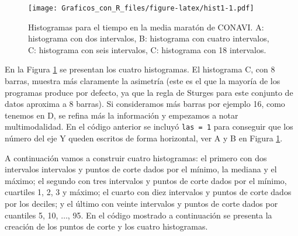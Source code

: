 \documentclass[10pt,]{krantz}
\begin{document}
\begin{figure}
\centering
\texttt{[image: Graficos\_con\_R\_files/figure-latex/hist1-1.pdf]}
\caption{\label{fig:hist1}Histogramas para el tiempo en la media maratón de
CONAVI. A: histograma con dos intervalos, B: histograma con cuatro
intervalos, C: histograma con seis intervalos, C: histograma con 18
intervalos.}
\end{figure}

En la Figura \ref{fig:hist1} se presentan los cuatro histogramas. El
histograma C, con 8 barras, muestra más claramente la asimetría (este es
el que la mayoría de los programas produce por defecto, ya que la regla
de Sturges para este conjunto de datos aproxima a 8 barras). Si
consideramos más barras por ejemplo 16, como tenemos en D, se refina más
la información y empezamos a notar multimodalidad. En el código anterior
se incluyó \texttt{las\ =\ 1} para conseguir que los número del eje Y
queden escritos de forma horizontal, ver A y B en Figura
\ref{fig:hist1}.

A continuación vamos a construir cuatro histogramas: el primero con dos
intervalos intervalos y puntos de corte dados por el mínimo, la mediana
y el máximo; el segundo con tres intervalos y puntos de corte dados por
el mínimo, cuartiles 1, 2, 3 y máximo; el cuarto con diez intervalos y
puntos de corte dados por los deciles; y el último con veinte intervalos
y puntos de corte dados por cuantiles 5, 10, \(\ldots\), 95. En el
código mostrado a continuación se presenta la creación de los puntos de
corte y los cuatro histogramas.
\end{document}
